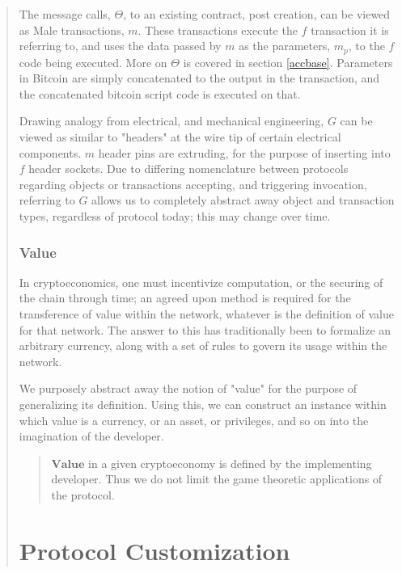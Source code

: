 \documentclass[12pt, titlepage, twocolumn]{report}
\begin{document}
\begin{quotation}
The message calls, \(\Theta\), to an existing contract, post creation, can be viewed as Male transactions, \(m\). These transactions execute the \(f\) transaction it is referring to, and uses the data passed by \(m\) as the parameters, \(m_p\), to the \(f\) code being executed. More on \(\Theta\) is covered in section \ref{accbase}. Parameters in Bitcoin are simply concatenated to the output in the transaction, and the concatenated bitcoin script code is executed on that.

Drawing analogy from electrical, and mechanical engineering, \(G\) can be viewed as similar to "headers" at the wire tip of certain electrical components. \(m\) header pins are extruding, for the purpose of inserting into \(f\) header sockets. Due to differing nomenclature between protocols regarding objects or transactions accepting, and triggering invocation, referring to \(G\) allows us to completely abstract away object and transaction types, regardless of protocol today; this may change over time.

\subsection{Value}
In cryptoeconomics, one must incentivize computation, or the securing of the chain through time; an agreed upon method is required for the transference of value within the network, whatever is the definition of value for that network. The answer to this has traditionally been to formalize an arbitrary currency, along with a set of rules to govern its usage within the network.

We purposely abstract away the notion of "value" for the purpose of generalizing its definition. Using this, we can construct an instance within which value is a currency, or an asset, or privileges, and so on into the imagination of the developer. 

\begin{quotation}
  \(\boldsymbol{Value}\) in a given cryptoeconomy is defined by the implementing developer. Thus we do not limit the game theoretic applications of the protocol.
 \end{quotation}



\chapter{Protocol Customization}


\end{quotation}
\end{document}
